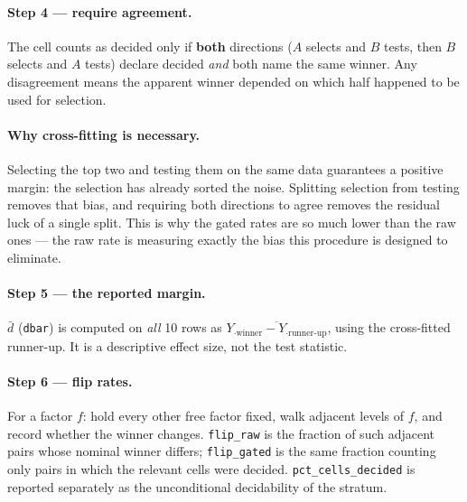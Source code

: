 \paragraph{Step 4 --- require agreement.}
The cell counts as decided only if \textbf{both} directions ($A$ selects and $B$
tests, then $B$ selects and $A$ tests) declare decided \emph{and} both name the
same winner. Any disagreement means the apparent winner depended on which half
happened to be used for selection.

\paragraph{Why cross-fitting is necessary.}
Selecting the top two and testing them on the same data guarantees a positive
margin: the selection has already sorted the noise. Splitting selection from
testing removes that bias, and requiring both directions to agree removes the
residual luck of a single split. This is why the gated rates are so much lower
than the raw ones --- the raw rate is measuring exactly the bias this procedure
is designed to eliminate.

\paragraph{Step 5 --- the reported margin.}
$\bar d$ (\texttt{dbar}) is computed on \emph{all} 10 rows as
$\overline{Y_{\cdot\text{winner}} - Y_{\cdot\text{runner-up}}}$, using the
cross-fitted runner-up. It is a descriptive effect size, not the test statistic.

\paragraph{Step 6 --- flip rates.}
For a factor $f$: hold every other free factor fixed, walk adjacent levels of
$f$, and record whether the winner changes. \texttt{flip\_raw} is the fraction
of such adjacent pairs whose nominal winner differs; \texttt{flip\_gated} is the
same fraction counting only pairs in which the relevant cells were decided.
\texttt{pct\_cells\_decided} is reported separately as the unconditional
decidability of the stratum.
